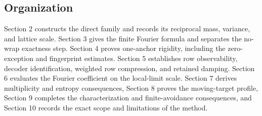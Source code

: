 \subsection{Organization}

Section 2 constructs the direct family and records its reciprocal mass, variance, and lattice scale. Section 3 gives the finite Fourier formula and separates the no-wrap exactness step. Section 4 proves one-anchor rigidity, including the zero-exception and fingerprint estimates. Section 5 establishes row observability, decoder identification, weighted row compression, and retained damping. Section 6 evaluates the Fourier coefficient on the local-limit scale. Section 7 derives multiplicity and entropy consequences, Section 8 proves the moving-target profile, Section 9 completes the characterization and finite-avoidance consequences, and Section 10 records the exact scope and limitations of the method.